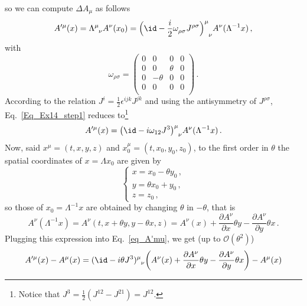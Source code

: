 \begin{sol}
    so we can compute $\Delta A_{\mu}$ as follows
    \begin{equation}
        A'^{\mu}(x) = \tensor{\Lambda}{^\mu_\nu} A^{\nu}(x_{0}) = \Bigl(\id - \frac{i}{2}\tensor{\omega}{_\rho_\sigma}J^{\rho \sigma}\tensor{\Bigr)}{^\mu_\nu} A^{\nu}(\Lambda^{-1} x) \,,
        \label{Eq_Ex14_step1}
    \end{equation}
    with
    \begin{equation}
        \omega_{\rho \sigma} = \begin{pmatrix}
            0 & 0 & 0 & 0 \\
            0 & 0 & \theta & 0 \\
            0 & -\theta & 0 & 0 \\
            0 & 0 & 0 & 0 \\
        \end{pmatrix}\,.
    \end{equation}
    According to the relation $J^i = \frac{1}{2} \epsilon^{ijk} J^{jk}$ and using the antisymmetry of $J^{\rho \sigma}$, Eq.~\eqref{Eq_Ex14_step1} reduces to\footnote{Notice that $J^{3} = \frac{1}{2}(J^{12}-J^{21}) = J^{12}$.} 
    \begin{equation}
    \label{eq_A'mu}
        A'^{\mu}(x) = \bigl(\id - i \omega_{12}J^{3}\tensor{\bigr)}{^\mu _\nu} A^{\nu}(\Lambda^{-1} x)\,.
    \end{equation}
    Now, said $x^\mu = (t,x,y,z)$ and $x_0^\mu = (t,x_0,y_0,z_0)$, to the first order in $\theta$ the spatial coordinates of $x = \Lambda x_0$ are given by
    \begin{equation}
        \begin{cases}
            x = x_0 - \theta y_0 \, , \\
            y = \theta x_0 + y_0 \, , \\
            z = z_0 \, ,
        \end{cases}
    \end{equation}
    so those of $x_0 = \Lambda^{-1} x$ are obtained by changing $\theta$ in $-\theta$, that is
    \begin{equation}
        A^{\nu}(\Lambda^{-1} x) = A^{\nu}(t, x+\theta y, y-\theta x, z) = A^{\nu}(x) + \frac{\partial A^{\nu}}{\partial x}\theta y - \frac{\partial A^{\nu}}{\partial y}\theta x \,.
    \end{equation}
    Plugging this expression into Eq.~\eqref{eq_A'mu}, we get (up to $\mathcal{O}(\theta^{2})$)
    \begin{align}
            A'^{\mu}(x) - A^{\mu}(x) &= (\id - i\theta J^{3}\tensor{)}{^\mu _\nu}\biggl(A^{\nu}(x) + \frac{\partial A^{\nu}}{\partial x}\theta y - \frac{\partial A^{\nu}}{\partial y}\theta x\biggr) - A^{\mu}(x) \notag\\

\end{align}
\end{sol}

